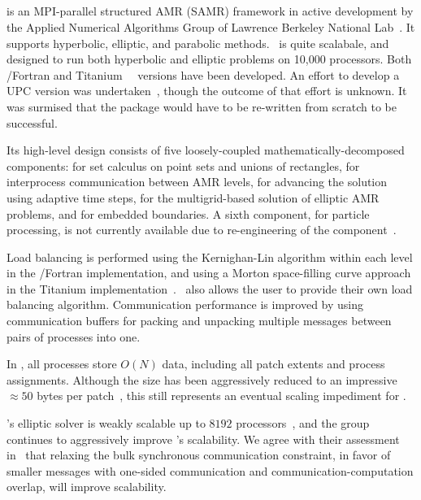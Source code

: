 \documentclass[10pt,twocolumn]{article}
\begin{document}
\subsection{\chombo} \label{ss:chombo}

\chombo is an MPI-parallel structured AMR (SAMR) framework in active
development by the Applied Numerical Algorithms Group of Lawrence
Berkeley National Lab~\nocite{CoGr09}.  It supports hyperbolic,
elliptic, and parabolic methods.  \chombo\ is quite scalabale, and
designed to run both hyperbolic and elliptic problems on 10,000
processors.  Both \cpp/Fortran and
Titanium~\cite{wwwtitanium}~\cite{YeSe98} versions have been
developed.  An effort to develop a UPC version was
undertaken~\cite{We04}, though the outcome of that effort is unknown.
It was surmised that the package would have to be re-written from
scratch to be successful.

Its high-level design consists of five loosely-coupled
mathematically-decomposed components:  for set calculus
on point sets and unions of rectangles,  for
interprocess communication between AMR levels, 
for advancing the solution using adaptive time steps,
 for the multigrid-based solution of elliptic AMR
problems, and  for embedded boundaries.  A sixth
component,  for particle processing, is not
currently available due to re-engineering of the
component~\cite{wwwchombo}.

Load balancing is performed using the Kernighan-Lin algorithm within
each level in the \cpp/Fortran implementation, and using a Morton
space-filling curve approach in the Titanium
implementation~\cite{WeSu07}.  \chombo\ also allows the user to
provide their own load balancing algorithm.  Communication performance
is improved by using communication buffers for packing and unpacking
multiple messages between pairs of processes into one.

In \chombo, all processes store $O(N)$
data, including all patch extents and process assignments.  Although
the size has been aggressively reduced to an impressive $\approx 50$
bytes per patch~\cite{CoBe07}, this still represents an eventual
scaling impediment for \chombo.

\chombo's elliptic solver is weakly scalable up to $8192$
processors~\cite{WeSu07}, and the group continues to aggressively
improve \chombo's scalability.  We agree with their assessment
in~\cite{WeSu07} that relaxing the bulk synchronous communication
constraint, in favor of smaller messages with one-sided communication
and communication-computation overlap, will improve scalability.
\end{document}
